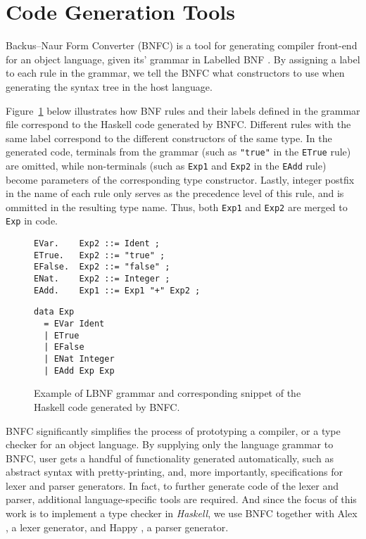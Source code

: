 \section{Code Generation Tools}

Backus–Naur Form Converter (BNFC) \cite{BNFC} is a tool for generating compiler front-end for an object language, given its' grammar in Labelled BNF \cite{BackusNaurForm2003}. By assigning a label to each rule in the grammar, we tell the BNFC what constructors to use when generating the syntax tree in the host language.

Figure~\ref{fig:lbnf-bnfc-example} below illustrates how BNF rules and their labels defined in the grammar file correspond to the Haskell code generated by BNFC. Different rules with the same label correspond to the different constructors of the same type. In the generated code, terminals from the grammar (such as \texttt{"true"} in the \texttt{ETrue} rule) are omitted, while non-terminals (such as \texttt{Exp1} and \texttt{Exp2} in the \texttt{EAdd} rule) become parameters of the corresponding type constructor. Lastly, integer postfix in the name of each rule only serves as the precedence level of this rule, and is ommitted in the resulting type name. Thus, both \texttt{Exp1} and \texttt{Exp2} are merged to \texttt{Exp} in code.

\begin{figure}[H]
  \centering
  \begin{minipage}{0.49\textwidth}
    \begin{verbatim}
EVar.    Exp2 ::= Ident ;
ETrue.   Exp2 ::= "true" ;
EFalse.  Exp2 ::= "false" ;
ENat.    Exp2 ::= Integer ;
EAdd.    Exp1 ::= Exp1 "+" Exp2 ;
    \end{verbatim}
    \hfill
  \end{minipage}
  \begin{minipage}{0.49\textwidth}
    \begin{verbatim}
data Exp
  = EVar Ident
  | ETrue 
  | EFalse
  | ENat Integer
  | EAdd Exp Exp
    \end{verbatim}
  \end{minipage}
  \caption{Example of LBNF grammar and corresponding snippet of the Haskell code generated by BNFC.}
  \label{fig:lbnf-bnfc-example}
\end{figure}

BNFC significantly simplifies the process of prototyping a compiler, or a type checker for an object language. By supplying only the language grammar to BNFC, user gets a handful of functionality generated automatically, such as abstract syntax with pretty-printing, and, more importantly, specifications for lexer and parser generators. In fact, to further generate code of the lexer and parser, additional language-specific tools are required. And since the focus of this work is to implement a type checker in \textit{Haskell}, we use BNFC together with Alex \cite{haskell_alex}, a lexer generator, and Happy \cite{haskell_happy}, a parser generator.
